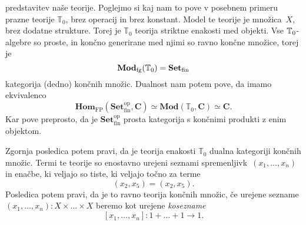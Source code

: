 \documentclass[../kategoricna_logika.tex]{subfiles}
\begin{document}
predstavitev naše teorije.
Poglejmo si kaj nam to pove v posebnem primeru prazne teorije \(\mathbb{T}_0\),
brez operacij in brez konstant. Model te teorije je množica~\(X\),
brez dodatne strukture. Torej je \(\mathbb{T}_0\) teorija striktne enakosti
med objekti.
Vse $\mathbb{T}\textsubscript{0}$-algebre so proste, in končno generirane med njimi
so ravno končne množice, torej je
\[ \mathbf{Mod}_{\mathrm{fg}}(\mathbb{T}_0) = \mathbf{Set} _{\mathrm{fin}} \]
kategorija (dedno) končnih množic. Dualnost nam potem pove, da
imamo ekvivalenco
\[ \mathbf{Hom}_{\mathrm{FP}}(\mathbf{Set}_{\mathrm{fin}}^{\mathrm{op}}, \mathbf{C}) \simeq
   \mathbf{Mod}(\mathbb{T}_0, \mathbf{C}) \simeq \mathbf{C}. \]
Kar pove preprosto, da je \(\mathbf{Set}_{\mathrm{fin}}^{\mathrm{op}}\)
prosta kategorija s končnimi produkti z enim objektom.

Zgornja posledica potem pravi, da je teorija enakosti \(\mathbb{T}_0\) dualna
kategoriji končnih množic. Termi te teorije so enostavno urejeni seznami
spremenljivk~\((x_1, \ldots, x_n)\) in enačbe, ki veljajo so tiste,
ki veljajo točno za terme
\[(x_2, x_5) = (x_2, x_5).\]
Posledica potem pravi, da je to ravno teorija končnih množic, če
urejene sezname \((x_1, \ldots, x_n) : X \times \ldots \times X\) beremo
kot urejene \emph{kosezname} \[[x_1, \ldots, x_n] : 1 + \ldots + 1 \to 1.\]
%
%
\end{document}
